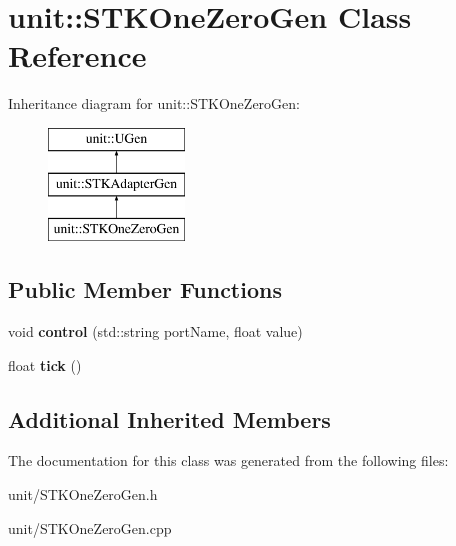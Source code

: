 \hypertarget{classunit_1_1STKOneZeroGen}{}\section{unit\+:\+:S\+T\+K\+One\+Zero\+Gen Class Reference}
\label{classunit_1_1STKOneZeroGen}
Inheritance diagram for unit\+:\+:S\+T\+K\+One\+Zero\+Gen\+:\begin{figure}[H]
\begin{center}
\leavevmode
\includegraphics[height=3.000000cm]{classunit_1_1STKOneZeroGen}
\end{center}
\end{figure}
\subsection*{Public Member Functions}
\begin{DoxyCompactItemize}
\item 
void {\bfseries control} (std\+::string port\+Name, float value)\hypertarget{classunit_1_1STKOneZeroGen_a44bc26cf6f0e7218f9f14447c957dce4}{}\label{classunit_1_1STKOneZeroGen_a44bc26cf6f0e7218f9f14447c957dce4}

\item 
float {\bfseries tick} ()\hypertarget{classunit_1_1STKOneZeroGen_ab1118ea13c6892f49c8f92f017b82908}{}\label{classunit_1_1STKOneZeroGen_ab1118ea13c6892f49c8f92f017b82908}

\end{DoxyCompactItemize}
\subsection*{Additional Inherited Members}


The documentation for this class was generated from the following files\+:\begin{DoxyCompactItemize}
\item 
unit/S\+T\+K\+One\+Zero\+Gen.\+h\item 
unit/S\+T\+K\+One\+Zero\+Gen.\+cpp\end{DoxyCompactItemize}
